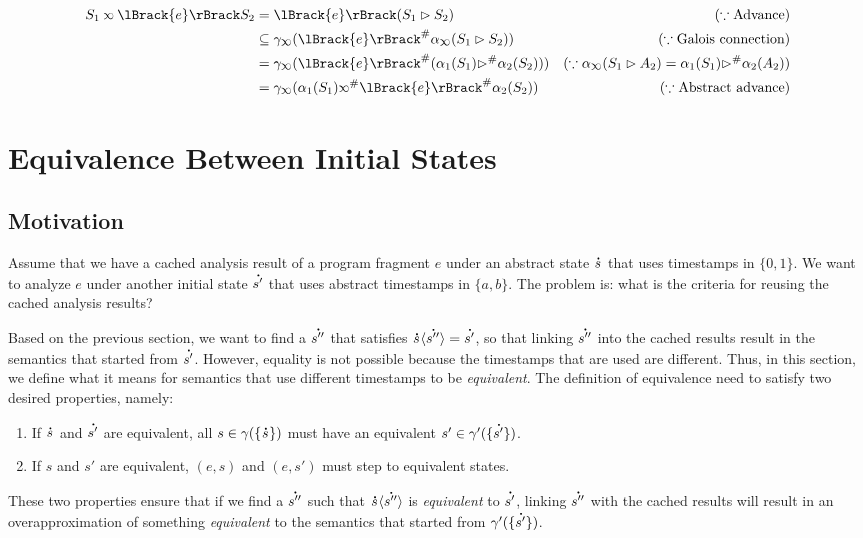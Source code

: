 \documentclass[acmsmall,screen,review]{acmart}\settopmatter{printfolios=true,printccs=false,printacmref=false}
\newcommand*{\A}[1]{\overset{\,_{\mbox{\Large .}}}{#1}}
\newcommand*{\Abs}[1]{{#1}^{\#}}
\newcommand*{\semlink}{\mathbin{\rotatebox[origin=c]{180}{$\propto$}}}
\newcommand*{\sembracket}[1]{\lBrack{#1}\rBrack}
\newcommand*{\inject}[2]{{#2}\langle{#1}\rangle}
\begin{document}
\begin{align*}
  S_1\semlink\sembracket{e}S_2 & =\sembracket{e}(S_1\rhd S_2)                                                   & (\because\text{Advance})                                                    \\
                               & \subseteq\gamma_{\semlink}(\Abs{\sembracket{e}}\alpha_{\semlink}(S_1\rhd S_2)) & (\because\text{Galois connection})                                          \\
                               & =\gamma_{\semlink}(\Abs{\sembracket{e}}(\alpha_1(S_1)\Abs\rhd\alpha_2(S_2)))   & (\because\alpha_{\semlink}(S_1\rhd A_2)=\alpha_1(S_1)\Abs\rhd\alpha_2(A_2)) \\
                               & =\gamma_{\semlink}(\alpha_1(S_1)\Abs\semlink\Abs{\sembracket{e}}\alpha_2(S_2)) & (\because\text{Abstract advance})
\end{align*}
\section{Equivalence Between Initial States}
\subsection{Motivation}
Assume that we have a cached analysis result of a program fragment $e$ under an abstract state $\A{s}$ that uses timestamps in $\{0,1\}$.
We want to analyze $e$ under another initial state $\A{s'}$ that uses abstract timestamps in $\{a,b\}$.
The problem is: what is the criteria for reusing the cached analysis results?

Based on the previous section, we want to find a $\A{s''}$ that satisfies $\inject{\A{s''}}{\A{s}}=\A{s'}$, so that linking $\A{s''}$ into the cached results result in the semantics that started from $\A{s'}$.
However, equality is not possible because the timestamps that are used are different.
Thus, in this section, we define what it means for semantics that use different timestamps to be \emph{equivalent}.
The definition of equivalence need to satisfy two desired properties, namely:
\begin{enumerate}
  \item If $\A{s}$ and $\A{s'}$ are equivalent, all $s\in\gamma(\{\A{s}\})$ must have an equivalent $s'\in\gamma'(\{\A{s'}\})$.
  \item If $s$ and $s'$ are equivalent, $(e,s)$ and $(e,s')$ must step to equivalent states.
\end{enumerate}
These two properties ensure that if we find a $\A{s''}$ such that $\inject{\A{s''}}{\A{s}}$ is \emph{equivalent} to $\A{s'}$, linking $\A{s''}$ with the cached results will result in an overapproximation of something \emph{equivalent} to the semantics that started from $\gamma'(\{\A{s'}\})$.
\end{document}

